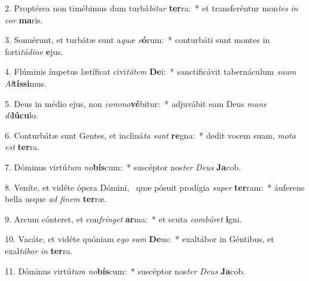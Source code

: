 2. Proptérea non timébimus dum turbá\textit{bi}\textit{tur} \textbf{ter}ra:~*  et transferéntur mon\textit{tes} \textit{in} \textit{cor} \textbf{ma}ris.\

3. Sonuérunt, et turbátæ sunt a\textit{quæ} \textit{e}\textbf{ó}rum:~*  conturbáti sunt montes in forti\textit{tú}\textit{di}\textit{ne} \textbf{e}jus.\

4. Flúminis ímpetus lætíficat civi\textit{tá}\textit{tem} \textbf{De}i:~*  sanctificávit tabernáculum \textit{su}\textit{um} \textit{Al}\textbf{tís}\textbf{si}mus.\

5. Deus in médio ejus, non \textit{com}\textit{mo}\textbf{vé}bitur:~*  adjuvábit eam Deus \textit{ma}\textit{ne} \textit{di}\textbf{lú}\textbf{cu}lo.\

6. Conturbátæ sunt Gentes, et incliná\textit{ta} \textit{sunt} \textbf{re}gna:~*  dedit vocem suam, \textit{mo}\textit{ta} \textit{est} \textbf{ter}ra.\

7. Dóminus virtú\textit{tum} \textit{no}\textbf{bís}cum:~*  suscéptor nos\textit{ter} \textit{De}\textit{us} \textbf{Ja}cob.\

8. Veníte, et vidéte ópera Dómini, \dag\  quæ pósuit prodígia \textit{su}\textit{per} \textbf{ter}ram:~*  áuferens bella usque \textit{ad} \textit{fi}\textit{nem} \textbf{ter}ræ.\

9. Arcum cónteret, et con\textit{frín}\textit{get} \textbf{ar}ma:~*  et scuta \textit{com}\textit{bú}\textit{ret} \textbf{i}gni.\

10. Vacáte, et vidéte quóniam e\textit{go} \textit{sum} \textbf{De}us:~*  exaltábor in Géntibus, et exal\textit{tá}\textit{bor} \textit{in} \textbf{ter}ra.\

11. Dóminus virtú\textit{tum} \textit{no}\textbf{bís}cum:~*  suscéptor nos\textit{ter} \textit{De}\textit{us} \textbf{Ja}cob.\

